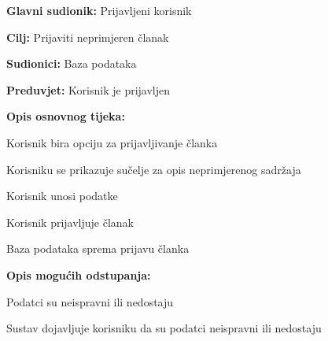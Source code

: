 \noindent {}
\begin{packed_item}

\item \textbf{Glavni sudionik:} Prijavljeni korisnik
\item  \textbf{Cilj:} Prijaviti neprimjeren članak
\item  \textbf{Sudionici:} Baza podataka
\item  \textbf{Preduvjet:} Korisnik je prijavljen
\item  \textbf{Opis osnovnog tijeka:}

\item[] \begin{packed_enum}

    \item Korisnik bira opciju za prijavljivanje članka
    \item Korisniku se prikazuje sučelje za opis neprimjerenog sadržaja
    \item Korisnik unosi podatke
    \item Korisnik prijavljuje članak
    \item Baza podataka sprema prijavu članka

\end{packed_enum}

\item  \textbf{Opis mogućih odstupanja:}

\item[] \begin{packed_item}

    \item[5.a] Podatci su neispravni ili nedostaju
    \item[] \begin{packed_enum}

        \item Sustav dojavljuje korisniku da su podatci neispravni ili nedostaju

    \end{packed_enum}

\end{packed_item}
\end{packed_item}


